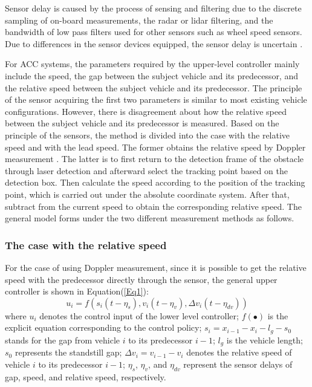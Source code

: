 \documentclass[a4paper]{cas-sc}
\begin{document}
Sensor delay is caused by the process of sensing and filtering due to the discrete sampling of on-board measurements, the radar or lidar filtering, and the bandwidth of low pass filters used for other sensors such as wheel speed sensors. Due to differences in the sensor devices equipped, the sensor delay is uncertain \citep{Loke2019}.

For ACC systems, the parameters required by the upper-level controller mainly include the speed, the gap between the subject vehicle and its predecessor, and the relative speed between the subject vehicle and its predecessor. The principle of the sensor acquiring the first two parameters is similar to most existing vehicle configurations. However, there is disagreement about how the relative speed between the subject vehicle and its predecessor is measured. Based on the principle of the sensors, the method is divided into the case with the relative speed and with the lead speed. The former obtains the relative speed by Doppler measurement \citep{pinson2016relative}. The latter is to first return to the detection frame of the obstacle through laser detection and afterward select the tracking point based on the detection box. Then calculate the speed according to the position of the tracking point, which is carried out under the absolute coordinate system. After that, subtract from the current speed to obtain the corresponding relative speed. The general model forms under the two different measurement methods as follows.

\subsubsection{The case with the relative speed}
\label{Section 2.2.1}

For the case of using Doppler measurement, since it is possible to get the relative speed with the predecessor directly through the sensor, the general upper controller is shown in Equation(\ref{Eq1}):
\begin{equation}
  u_i=f(s_i\left(t-\eta_s\right),v_i\left(t-\eta_v\right),\Delta v_i(t-\eta_{dv}))
  \label{Eq1}
\end{equation}
where $u_i$ denotes the control input of the lower level controller; $f(\bullet)$ is the explicit equation corresponding to the control policy; $s_i=x_{i-1}-x_i-l_g-s_0$ stands for the gap from vehicle $i$ to its predecessor $i-1$; $l_g$ is the vehicle length; $s_0$ represents the standstill gap; $\Delta v_i=v_{i-1}-v_i$ denotes the relative speed of vehicle $i$ to its predecessor $i-1$; $\eta_s$, $\eta_v$, and $\eta_{dv}$ represent the sensor delays of gap, speed, and relative speed, respectively.
\end{document}
